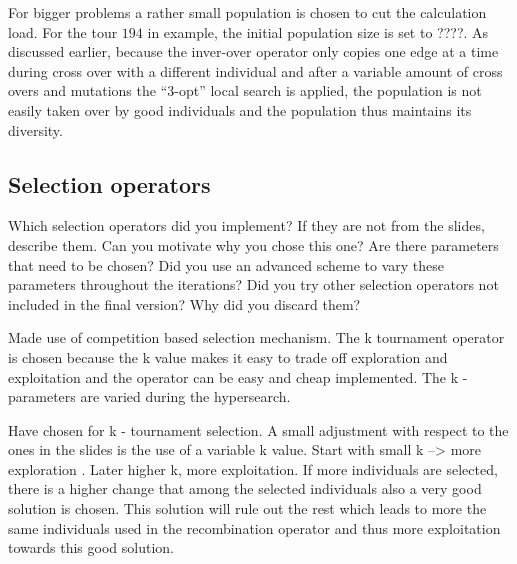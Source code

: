 \documentclass[a4paper,10pt]{article}
\newcommand{\ReplaceMe}[1]{{\color{blue}#1}}
\begin{document}
For bigger problems a rather small population is chosen to cut the calculation load. For the tour $194$ in example, the initial population size is set to ????. As discussed earlier, because the inver-over operator only copies one edge at a time during cross over with a different individual and after a variable amount of cross overs and mutations the ``3-opt'' local search is applied, the population is not easily taken over by good individuals and the population thus maintains its diversity. 





%
%
%




\subsection{Selection operators}

\ReplaceMe{Which selection operators did you implement? If they are not from the slides, describe them. Can you motivate why you chose this one? Are there parameters that need to be chosen? Did you use an advanced scheme to vary these parameters throughout the iterations? Did you try other selection operators not included in the final version? Why did you discard them?}

Made use of competition based selection mechanism. The k tournament operator is chosen because the k value makes it easy to trade off exploration and exploitation and the operator can be easy and cheap implemented. The k -parameters are varied during the hypersearch. 

Have chosen for k - tournament selection. A small adjustment with respect to the ones in the slides is the use of a variable k value. Start with small k --> more exploration . Later higher k, more exploitation. If more individuals are selected, there is a higher change that among the selected individuals also a very good solution is chosen. This solution will rule out the rest which leads to more the same individuals used in the recombination operator and thus more exploitation towards this good solution. 
\end{document}
